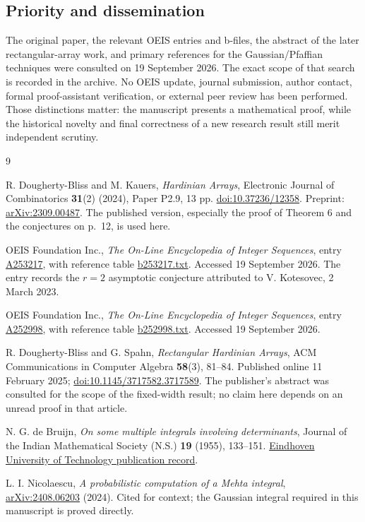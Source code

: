 \documentclass[11pt]{article}
\numberwithin{equation}{section}
\theoremstyle{definition}
\begin{document}
\subsection*{Priority and dissemination}
The original paper, the relevant OEIS entries and b-files, the abstract of the later rectangular-array work, and primary references for the Gaussian/Pfaffian techniques were consulted on 19 September 2026. The exact scope of that search is recorded in the archive. No OEIS update, journal submission, author contact, formal proof-assistant verification, or external peer review has been performed. Those distinctions matter: the manuscript presents a mathematical proof, while the historical novelty and final correctness of a new research result still merit independent scrutiny.

\begin{thebibliography}{9}

R. Dougherty-Bliss and M. Kauers,
\emph{Hardinian Arrays},
Electronic Journal of Combinatorics \textbf{31}(2) (2024), Paper P2.9, 13 pp.
\href{https://doi.org/10.37236/12358}{doi:10.37236/12358}.
Preprint: \href{https://arxiv.org/abs/2309.00487}{arXiv:2309.00487}.
The published version, especially the proof of Theorem 6 and the conjectures on p.~12, is used here.

OEIS Foundation Inc.,
\emph{The On-Line Encyclopedia of Integer Sequences},
entry \href{https://oeis.org/A253217}{A253217},
with reference table \href{https://oeis.org/A253217/b253217.txt}{b253217.txt}.
Accessed 19 September 2026. The entry records the $r=2$ asymptotic conjecture attributed to V. Kotesovec, 2 March 2023.

OEIS Foundation Inc.,
\emph{The On-Line Encyclopedia of Integer Sequences},
entry \href{https://oeis.org/A252998}{A252998},
with reference table \href{https://oeis.org/A252998/b252998.txt}{b252998.txt}.
Accessed 19 September 2026.

R. Dougherty-Bliss and G. Spahn,
\emph{Rectangular Hardinian Arrays},
ACM Communications in Computer Algebra \textbf{58}(3), 81--84.
Published online 11 February 2025;
\href{https://doi.org/10.1145/3717582.3717589}{doi:10.1145/3717582.3717589}.
The publisher's abstract was consulted for the scope of the fixed-width result; no claim here depends on an unread proof in that article.

N. G. de Bruijn,
\emph{On some multiple integrals involving determinants},
Journal of the Indian Mathematical Society (N.S.) \textbf{19} (1955), 133--151.
\href{https://research.tue.nl/en/publications/on-some-multiple-integrals-involving-determinants/}{Eindhoven University of Technology publication record}.

L. I. Nicolaescu,
\emph{A probabilistic computation of a Mehta integral},
\href{https://arxiv.org/abs/2408.06203}{arXiv:2408.06203} (2024).
Cited for context; the Gaussian integral required in this manuscript is proved directly.

\end{thebibliography}
\end{document}
